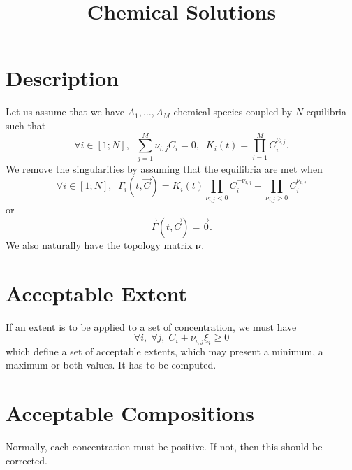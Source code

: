 \documentclass[aps]{revtex4}
\newcommand{\mymat}[1]{\bm{#1}}
\begin{document}
\title{Chemical Solutions}

\section{Description}
Let us assume that we have $A_1,\ldots,A_M$ chemical species coupled by
$N$ equilibria such that
\begin{equation}
	\forall i \in [1;N], \;\; \sum_{j=1}^{M} \nu_{i,j} C_i = 0, \;\; K_i(t) = \prod_{i=1}^{M} C_i^{\nu_{i,j}}.
\end{equation}
We remove the singularities by assuming that the equilibria are met when
\begin{equation}
	\forall i \in [1;N], \;\; \Gamma_i(t,\vec{C}) = K_i(t) \prod_{\nu_{i,j}<0}  C_i^{-\nu_{i,j}} -  \prod_{\nu_{i,j}>0} C_i^{\nu_{i,j}} 
\end{equation}
or
\begin{equation}
	\vec{\Gamma}(t,\vec{C}) = \vec{0}.
\end{equation}
We also naturally have the topology matrix $\mymat{\nu}$.

\section{Acceptable Extent}
If an extent is to be applied to a set of concentration, we must have
$$
	\forall i,\;\forall j,\;C_i + \nu_{i,j}\xi_i \geq 0
$$
which define a set of acceptable extents, which may present a minimum, a maximum or both values.
It has to be computed.

\section{Acceptable Compositions}
Normally, each concentration must be positive. If not, then this should be corrected.
\end{document}
